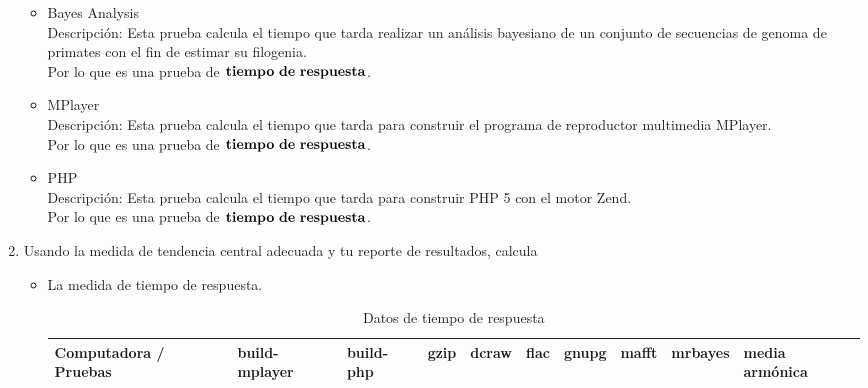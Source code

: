 \documentclass{article}
\begin{document}
\begin{enumerate}
{\begin{itemize}
{                    Descripción: Esta prueba calcula cuánto tiempo tarda realizar una alineación de 100 secuencias de decarboxilasa piruvato.\\
                    Por lo que es una prueba de $\bf{tiempo\ de\ respuesta}$.
                }
                \item {
                    Bayes Analysis \\
                    Descripción: Esta prueba calcula el tiempo que tarda realizar un análisis bayesiano de un conjunto de secuencias de genoma de primates con el fin de estimar su filogenia.\\
                    Por lo que es una prueba de $\bf{tiempo\ de\ respuesta}$.
                }
                \item {
                    MPlayer \\
                    Descripción: Esta prueba calcula el tiempo que tarda para construir el programa de reproductor multimedia MPlayer. \\
                    Por lo que es una prueba de $\bf{tiempo\ de\ respuesta}$.
                }
                \item {
                    PHP \\
                    Descripción: Esta prueba calcula el tiempo que tarda para construir PHP 5 con el motor Zend. \\
                    Por lo que es una prueba de $\bf{tiempo\ de\ respuesta}$.\\

                }
            \end{itemize}
        }
        
        \item {
            Usando la medida de tendencia central adecuada y tu reporte de 
            resultados, calcula            
            \begin{itemize}
                \item {
                    La medida de tiempo de respuesta.
                    \begin{table}[H]
                        \caption*{Datos de tiempo de respuesta}
                        \begin{tabular}{|l|l|l|l|l|l|l|l|l|l|}
                        \toprule
                        Computadora / Pruebas
                        & \cellcolor[HTML]{DAE8FC}build-mplayer 
                        & \cellcolor[HTML]{DAE8FC}build-php 
                        & \cellcolor[HTML]{DAE8FC}gzip 
                        & \cellcolor[HTML]{DAE8FC}dcraw  
                        & \cellcolor[HTML]{DAE8FC}flac 
                        & \cellcolor[HTML]{DAE8FC}gnupg 
                        & \cellcolor[HTML]{DAE8FC}mafft 
                        & \cellcolor[HTML]{DAE8FC}mrbayes 
                        & \cellcolor[HTML]{DAE8FC}media armónica \\ \hline
            

\end{tabular}
\end{table}}
\end{itemize}}
\end{enumerate}
\end{document}
